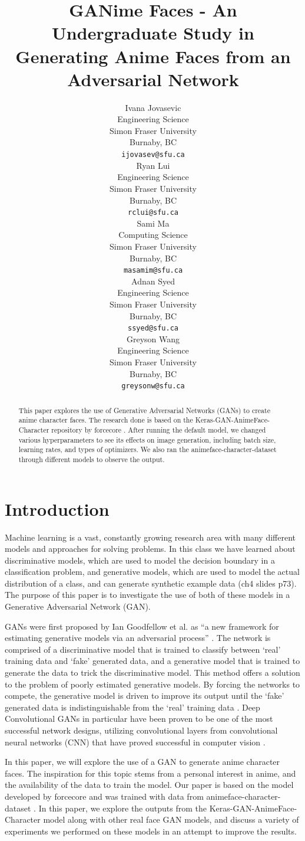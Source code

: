 \documentclass{article} %
\title{GANime Faces - An Undergraduate Study in Generating Anime Faces from an Adversarial Network}
\author{
Ivana Jovasevic\\
Engineering Science\\
Simon Fraser University\\
Burnaby, BC \\
\texttt{ijovasev@sfu.ca} \\
\And
Ryan Lui \\
Engineering Science \\
Simon Fraser University\\
Burnaby, BC \\
\texttt{rclui@sfu.ca} \\
\AND
Sami Ma \\
Computing Science \\
Simon Fraser University\\
Burnaby, BC \\
\texttt{masamim@sfu.ca} \\
\And
Adnan Syed \\
Engineering Science \\
Simon Fraser University\\
Burnaby, BC \\
\texttt{ssyed@sfu.ca} \\
\And
Greyson Wang \\
Engineering Science \\
Simon Fraser University\\
Burnaby, BC \\
\texttt{greysonw@sfu.ca} \\
}
\begin{document}
\maketitle

\begin{abstract}
This paper explores the use of Generative Adversarial Networks (GANs) to create anime character faces. The research done is based on the Keras-GAN-AnimeFace-Character repository by forcecore \cite{Keras-GAN-Animeface-Character}. After running the default model, we changed various hyperparameters to see its effects on image generation, including batch size, learning rates, and types of optimizers.  We also ran the animeface-character-dataset through different models to observe the output.
\end{abstract}

\section{Introduction}

Machine learning is a vast, constantly growing research area with many different models and approaches for solving problems. In this class we have learned about discriminative models, which are used to model the decision boundary in a classification problem, and generative models, which are used to model the actual distribution of a class, and can generate synthetic example data (ch4 slides p73). The purpose of this paper is to investigate the use of both of these models in a Generative Adversarial Network (GAN).

GANs were first proposed by Ian Goodfellow et al. as “a new framework for estimating generative models via an adversarial process” \cite{paperIanGAN}. The network is comprised of a discriminative model that is trained to classify between ‘real’ training data and ‘fake’ generated data, and a generative model that is trained to generate the data to trick the discriminative model. This method offers a solution to the problem of poorly estimated generative models. By forcing the networks to compete, the generative model is driven to improve its output until the ‘fake’ generated data is indistinguishable from the ‘real’ training data \cite{paperIanGAN}.  Deep Convolutional GANs in particular have been proven to be one of the most successful network designs, utilizing convolutional layers from convolutional neural networks (CNN) that have proved successful in computer vision \cite{unsupDCGAN}. 

In this paper, we will explore the use of a GAN to generate anime character faces. The inspiration for this topic stems from a personal interest in anime, and the availability of the data to train the model. Our paper is based on the model developed by forcecore \cite{Keras-GAN-Animeface-Character} and was trained with data from animeface-character-dataset \cite{animeface-character-dataset}. In this paper, we explore the outputs from the Keras-GAN-AnimeFace-Character model along with other real face GAN models, and discuss a variety of experiments we performed on these models in an attempt to improve the results. 
\end{document}
